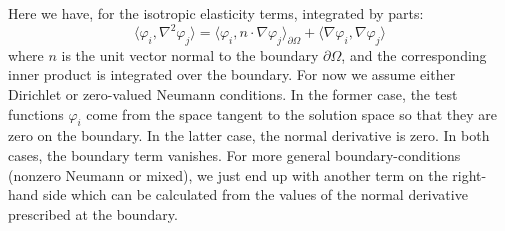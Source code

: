 \documentclass[reqno]{article}
\begin{document}
  Here we have, for the isotropic elasticity terms, integrated by parts:
  \begin{equation}
    \langle \varphi_i, \nabla^2 \varphi_j \rangle
    =
    \langle \varphi_i, n \cdot \nabla \varphi_j \rangle_{\partial \Omega}
    +
    \langle \nabla \varphi_i, \nabla \varphi_j \rangle
  \end{equation}
  where $n$ is the unit vector normal to the boundary $\partial \Omega$, and the
  corresponding inner product is integrated over the boundary.
  For now we assume either Dirichlet or zero-valued Neumann conditions.
  In the former case, the test functions $\varphi_i$ come from the space tangent
  to the solution space so that they are zero on the boundary.
  In the latter case, the normal derivative is zero.
  In both cases, the boundary term vanishes.
  For more general boundary-conditions (nonzero Neumann or mixed), we just end
  up with another term on the right-hand side which can be calculated from the
  values of the normal derivative prescribed at the boundary.
\end{document}
